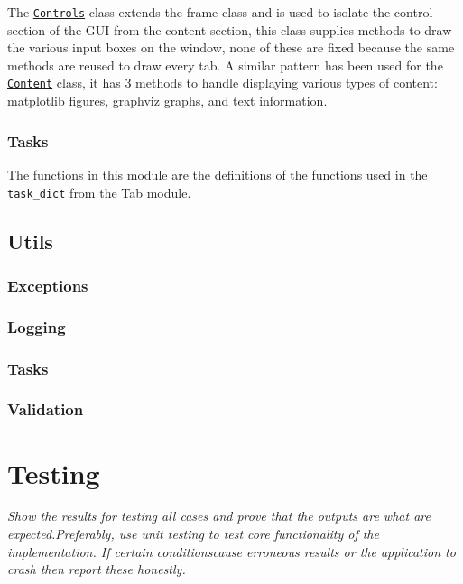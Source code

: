 \documentclass[11pt]{article}
\newcommand{\code}[1]{\colorbox{light-gray}{\texttt{#1}}}
\begin{document}
The \href{https://www2.macs.hw.ac.uk/~sf52/DocuTrace/html/DocuTrace.Gui.html#DocuTrace.Gui.Tab.Controls}{\code{Controls}} class extends the frame class and is used to isolate the control section of the GUI from the content section, this class supplies methods to draw the various input boxes on the window, none of these are fixed because the same methods are reused to draw every tab.
A similar pattern has been used for the \href{https://www2.macs.hw.ac.uk/~sf52/DocuTrace/html/DocuTrace.Gui.html#DocuTrace.Gui.Tab.Content}{\code{Content}} class, it has 3 methods to handle displaying various types of content: matplotlib figures, graphviz graphs, and text information.

\subsubsection{Tasks}
The functions in this \href{https://www2.macs.hw.ac.uk/~sf52/DocuTrace/html/DocuTrace.Gui.html#module-DocuTrace.Gui.Tasks}{module} are the definitions of the functions used in the \code{task\_dict} from the Tab module. 

\subsection{Utils}
\subsubsection{Exceptions}

\subsubsection{Logging}

\subsubsection{Tasks}

\subsubsection{Validation}

\section{Testing}
\emph{Show  the  results  for  testing  all  cases  and  prove  that  the  outputs  are  what  are  expected.Preferably,  use  unit  testing  to  test  core  functionality  of  the  implementation.   If  certain  conditionscause erroneous results or the application to crash then report these honestly.}
\end{document}
